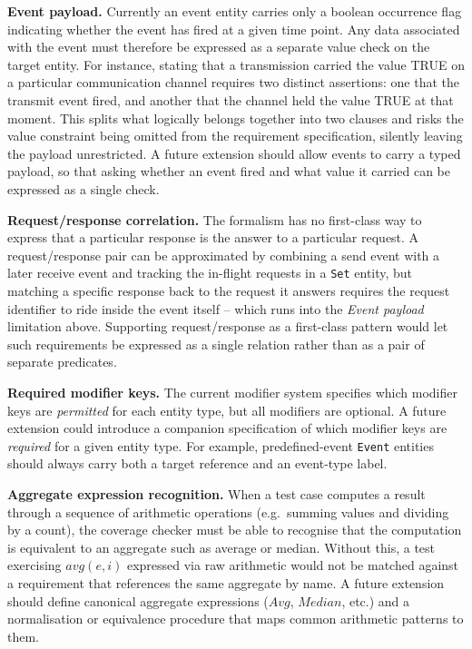 \textbf{Event payload.} Currently an event entity carries only a boolean occurrence flag indicating whether the event has fired at a given time point. Any data associated with the event must therefore be expressed as a separate value check on the target entity. For instance, stating that a transmission carried the value TRUE on a particular communication channel requires two distinct assertions: one that the transmit event fired, and another that the channel held the value TRUE at that moment. This splits what logically belongs together into two clauses and risks the value constraint being omitted from the requirement specification, silently leaving the payload unrestricted. A future extension should allow events to carry a typed payload, so that asking whether an event fired and what value it carried can be expressed as a single check.

\textbf{Request/response correlation.} The formalism has no first-class way to express that a particular response is the answer to a particular request. A request/response pair can be approximated by combining a send event with a later receive event and tracking the in-flight requests in a \texttt{Set} entity, but matching a specific response back to the request it answers requires the request identifier to ride inside the event itself -- which runs into the \emph{Event payload} limitation above. Supporting request/response as a first-class pattern would let such requirements be expressed as a single relation rather than as a pair of separate predicates.

\textbf{Required modifier keys.} The current modifier system specifies which modifier keys are \emph{permitted} for each entity type, but all modifiers are optional. A future extension could introduce a companion specification of which modifier keys are \emph{required} for a given entity type. For example, predefined-event \texttt{Event} entities should always carry both a target reference and an event-type label.

\textbf{Aggregate expression recognition.} When a test case computes a result through a sequence of arithmetic operations (e.g.\ summing values and dividing by a count), the coverage checker must be able to recognise that the computation is equivalent to an aggregate such as average or median. Without this, a test exercising $\mathit{avg}(e, i)$ expressed via raw arithmetic would not be matched against a requirement that references the same aggregate by name. A future extension should define canonical aggregate expressions ($\mathit{Avg}$, $\mathit{Median}$, etc.) and a normalisation or equivalence procedure that maps common arithmetic patterns to them.

